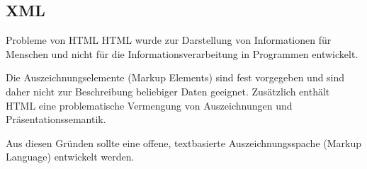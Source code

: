 \subsection{XML}

\begin{bonus}{Probleme von HTML}
    HTML wurde zur Darstellung von Informationen für Menschen und nicht für die Informationsverarbeitung in Programmen entwickelt.
    
    Die Auszeichnungselemente (Markup Elements) sind fest vorgegeben und sind daher nicht zur Beschreibung beliebiger Daten geeignet.
    Zusätzlich enthält HTML eine problematische Vermengung von Auszeichnungen und Präsentationssemantik.
    
    Aus diesen Gründen sollte eine offene, textbasierte Auszeichnungsspache (Markup Language) entwickelt werden.
\end{bonus}


